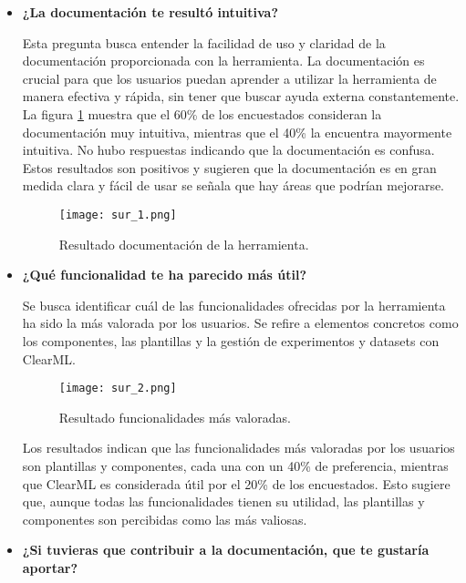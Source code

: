 \begin{itemize}
    \item \textbf{¿La documentación te resultó intuitiva?} 
    
    Esta pregunta busca entender la facilidad de uso y claridad de la documentación proporcionada 
    con la herramienta. La documentación es crucial para que los usuarios puedan 
    aprender a utilizar la herramienta de manera efectiva y rápida, sin tener que 
    buscar ayuda externa constantemente. La figura \ref{fig:sur_1} muestra que el 
    60\% de los encuestados consideran 
    la documentación muy intuitiva, mientras que el 40\% la encuentra 
    mayormente intuitiva. No hubo respuestas indicando que la documentación es 
    confusa. Estos resultados son positivos y sugieren que la documentación es 
    en gran medida clara y fácil de usar se señala que hay áreas que podrían mejorarse. 

    \begin{figure}[!h]
        \centering
        \texttt{[image: sur\_1.png]}
        \caption{Resultado documentación de la herramienta.}
        \label{fig:sur_1}
    \end{figure}
    
    \item \textbf{¿Qué funcionalidad te ha parecido más útil?} 
    
    Se busca identificar cuál de las funcionalidades ofrecidas por la 
    herramienta ha sido la más valorada por los usuarios. Se refire a 
    elementos concretos como los componentes, las plantillas y la gestión de
    experimentos y datasets con ClearML. 

    \begin{figure}[!h]
        \centering
        \texttt{[image: sur\_2.png]}
        \caption{Resultado funcionalidades más valoradas.}
        \label{fig:sur_2}
    \end{figure}

    Los resultados indican que las funcionalidades más valoradas por los usuarios son 
    plantillas y componentes, cada una con un 40\% de preferencia, mientras que 
    ClearML es considerada útil por el 20\% de los encuestados. Esto sugiere que, aunque todas 
    las funcionalidades tienen su utilidad, las plantillas y componentes son percibidas 
    como las más valiosas.

    \item \textbf{¿Si tuvieras que contribuir a la documentación, que te gustaría aportar?}
    

\end{itemize}
